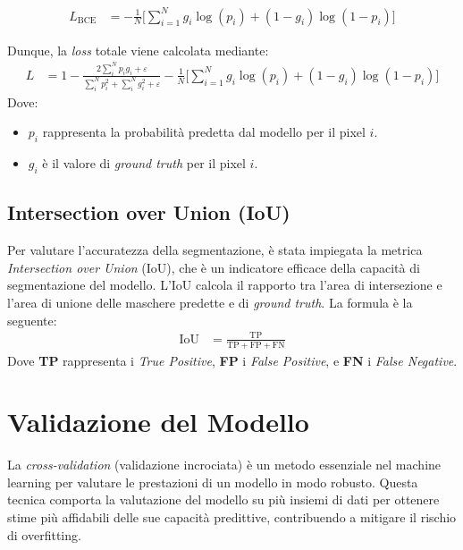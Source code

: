 \begin{align}
    L_{\text{BCE}} & = -\frac{1}{N} \Bigg[ \sum_{i=1}^N g_i \log(p_i) + (1 - g_i) \log(1 - p_i) \Bigg]
    \label{eq:bce_loss}
\end{align}

Dunque, la \textit{loss} totale viene calcolata mediante:
\begin{align}
    L & = 1 - \frac{2\sum_i^N p_i g_i + \varepsilon}{\sum_i^N p_i^2 + \sum_i^N g_i^2 + \varepsilon} -\frac{1}{N} \Bigg[ \sum_{i=1}^N g_i \log(p_i) + (1 - g_i) \log(1 - p_i) \Bigg]
    \label{eq:dice_bce_loss_complete}
\end{align}
Dove:
\begin{itemize}
    \item $p_i$ rappresenta la probabilità predetta dal modello per il pixel $i$.
    \item $g_i$ è il valore di \textit{ground truth} per il pixel $i$.
\end{itemize}


\subsection{Intersection over Union (IoU)}
\label{subsec:intersection_over_union}

Per valutare l'accuratezza della segmentazione, è stata impiegata la metrica \textit{Intersection
over Union} (IoU), che è un indicatore efficace della capacità di segmentazione del modello. L'IoU
calcola il rapporto tra l'area di intersezione e l'area di unione delle maschere predette e di
\textit{ground truth}. La formula è la seguente:
\begin{align}
    \text{IoU} & = \frac{\text{TP}}{\text{TP} + \text{FP} + \text{FN}}
    \label{eq:iou}
\end{align}
Dove \textbf{TP} rappresenta i \textit{True Positive}, \textbf{FP} i \textit{False Positive}, e
\textbf{FN} i \textit{False Negative}.


\section{Validazione del Modello}
\label{sec:model_validation}

La \textit{cross-validation} (validazione incrociata) è un metodo essenziale nel machine learning
per valutare le prestazioni di un modello in modo robusto. Questa tecnica comporta la valutazione
del modello su più insiemi di dati per ottenere stime più affidabili delle sue capacità predittive,
contribuendo a mitigare il rischio di overfitting.

